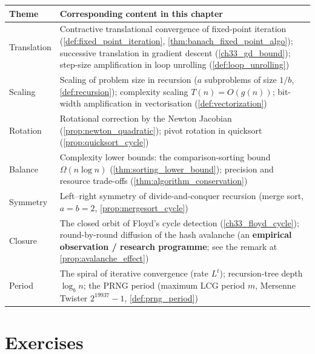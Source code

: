\begin{center}
\begin{tabular}{>{\centering\arraybackslash}p{2.3cm}>{\centering\arraybackslash}p{10.4cm}}
\toprule
Theme & Corresponding content in this chapter \\
\midrule
Translation & Contractive translational convergence of fixed-point iteration (\cref{def:fixed_point_iteration}, \cref{thm:banach_fixed_point_algo}); successive translation in gradient descent (\cref{ch33_gd_bound}); step-size amplification in loop unrolling (\cref{def:loop_unrolling}) \\
Scaling & Scaling of problem size in recursion ($a$ subproblems of size $1/b$, \cref{def:recursion}); complexity scaling $T(n)=O(g(n))$; bit-width amplification in vectorisation (\cref{def:vectorization}) \\
Rotation & Rotational correction by the Newton Jacobian (\cref{prop:newton_quadratic}); pivot rotation in quicksort (\cref{prop:quicksort_cycle}) \\
Balance & Complexity lower bounds: the comparison-sorting bound $\Omega(n\log n)$ (\cref{thm:sorting_lower_bound}); precision and resource trade-offs (\cref{thm:algorithm_conservation}) \\
Symmetry & Left--right symmetry of divide-and-conquer recursion (merge sort, $a=b=2$, \cref{prop:mergesort_cycle}) \\
Closure & The closed orbit of Floyd's cycle detection (\cref{ch33_floyd_cycle}); round-by-round diffusion of the hash avalanche (an \textbf{empirical observation / research programme}; see the remark at \cref{prop:avalanche_effect}) \\
Period & The spiral of iterative convergence (rate $L^t$); recursion-tree depth $\log_b n$; the PRNG period (maximum LCG period $m$, Mersenne Twister $2^{19937}-1$, \cref{def:prng_period}) \\
\bottomrule
\end{tabular}
\end{center}

\section*{Exercises}

